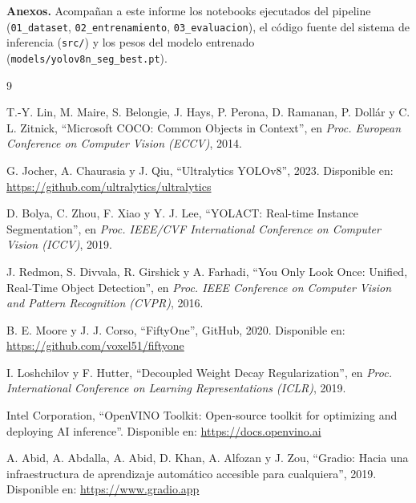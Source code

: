 \documentclass[11pt,a4paper]{article}
\begin{document}
\vspace{1.5em}
\noindent\textbf{Anexos.} Acompañan a este informe los notebooks ejecutados
del pipeline (\texttt{01\_dataset}, \texttt{02\_entrenamiento},
\texttt{03\_evaluacion}), el código fuente del sistema de inferencia
(\texttt{src/}) y los pesos del modelo entrenado
(\texttt{models/yolov8n\_seg\_best.pt}).

\begin{thebibliography}{9}

T.-Y. Lin, M. Maire, S. Belongie, J. Hays, P. Perona, D. Ramanan,
P. Dollár y C. L. Zitnick,
``Microsoft COCO: Common Objects in Context'',
en \emph{Proc. European Conference on Computer Vision (ECCV)}, 2014.

G. Jocher, A. Chaurasia y J. Qiu,
``Ultralytics YOLOv8'', 2023.
Disponible en: \url{https://github.com/ultralytics/ultralytics}

D. Bolya, C. Zhou, F. Xiao y Y. J. Lee,
``YOLACT: Real-time Instance Segmentation'',
en \emph{Proc. IEEE/CVF International Conference on Computer Vision (ICCV)}, 2019.

J. Redmon, S. Divvala, R. Girshick y A. Farhadi,
``You Only Look Once: Unified, Real-Time Object Detection'',
en \emph{Proc. IEEE Conference on Computer Vision and Pattern Recognition
(CVPR)}, 2016.

B. E. Moore y J. J. Corso,
``FiftyOne'', GitHub, 2020.
Disponible en: \url{https://github.com/voxel51/fiftyone}

I. Loshchilov y F. Hutter,
``Decoupled Weight Decay Regularization'',
en \emph{Proc. International Conference on Learning Representations (ICLR)}, 2019.

Intel Corporation,
``OpenVINO Toolkit: Open-source toolkit for optimizing and deploying AI
inference''.
Disponible en: \url{https://docs.openvino.ai}

A. Abid, A. Abdalla, A. Abid, D. Khan, A. Alfozan y J. Zou,
``Gradio: Hacia una infraestructura de aprendizaje automático accesible para
cualquiera'', 2019.
Disponible en: \url{https://www.gradio.app}

\end{thebibliography}
\end{document}
